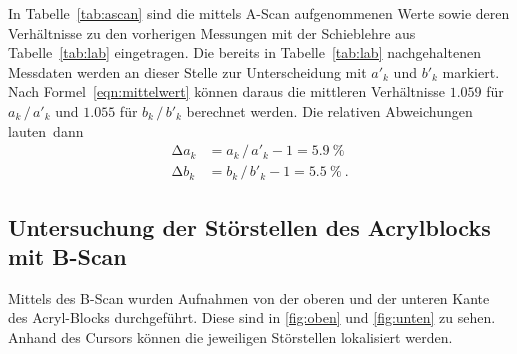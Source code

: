 In Tabelle~\ref{tab:ascan} sind die mittels A-Scan aufgenommenen Werte sowie deren Verhältnisse zu den vorherigen Messungen mit der Schieblehre
aus Tabelle~\ref{tab:lab} eingetragen. Die bereits in Tabelle~\ref{tab:lab} nachgehaltenen Messdaten werden an dieser Stelle zur Unterscheidung mit
$a'_k$ und $b'_k$ markiert. Nach Formel~\eqref{eqn:mittelwert} können daraus die mittleren Verhältnisse $\num{1,059}$ für $a_k \, / \, a'_k$ und
$\num{1.055}$ für $b_k \, / \, b'_k$ berechnet werden. Die relativen Abweichungen lauten~dann
\begin{align*}
	\increment a_k &= a_k \, / \, a'_k - 1 = \qty{5.9}{\percent} \\
	\increment b_k &= b_k \, / \, b'_k - 1 = \qty{5.5}{\percent} \: .
\end{align*}

\subsection{Untersuchung der Störstellen des Acrylblocks mit B-Scan}
\label{sec:Untersuchung der Störstellen des Aceylblocks mit B-Scan}

Mittels des B-Scan wurden Aufnahmen von der oberen und der unteren Kante des Acryl-Blocks durchgeführt.
Diese sind in \autoref{fig:oben} und \autoref{fig:unten} zu sehen. Anhand des Cursors können die jeweiligen Störstellen 
lokalisiert werden.

